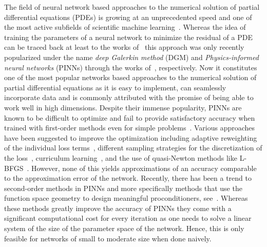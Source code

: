 
The field of neural network based approaches to the numerical solution of partial differential equations (PDEs) is growing at an unprecedented speed and one of the most active subfields of scientific machine learning~\cite{?}. 
Whereas the idea of training the parameters of a neural network to minimize the residual of a PDE can be traced back at least to the works of~\cite{dissanayake1994neural, lagaris1998artificial} this approach was only recently popularized under the name \emph{deep Galerkin method} (DGM) and \emph{Physics-informed neural networks} (PINNs) through the works of~\cite{sirignano2018dgm, raissi2019physics}, respectively.  
Now it constitutes one of the most popular networks based approaches to the numerical solution of partial differential equations as it is easy to implement, can seamlessly incorporate data and is commonly attributed with the promise of being able to work well in high dimensions. 
Despite their immense popularity, PINNs are known to be difficult to optimize and fail to provide satisfactory accuracy when trained with first-order methods even for simple problems~\cite{?}. 
Various approaches have been suggested to improve the optimization including adaptive reweighting of the individual loss terms~\citep{wang2021understanding,van2022optimally,wang2022and}, different sampling strategies for the discretization of the loss~\citep{lu2021deepxde, nabian2021efficient, daw2022rethinking,zapf2022investigating, wang2022respecting, wu2023comprehensive}, curriculum learning~\citep{wang2022respecting, krishnapriyan2021characterizing}, and the use of quasi-Newton methods like L-BFGS~\citep{markidis2021old}. 
However, none of this yields approximations of an accuracy comparable to the approximation error of the network. 
Recently, there has been a trend to second-order methods in PINNs and more specifically methods that use the function space geometry to design meaningful proconditioners, see~\citep{zeng2022competitive, muller2023achieving, de2023operator, liu2024preconditioning}. 
Whereas these methods greatly improve the accuracy of PINNs they come with a significant computational cost for every iteration as one needs to solve a linear system of the size of the parameter space of the network. 
Hence, this is only feasible for networks of small to moderate size when done naively. 


